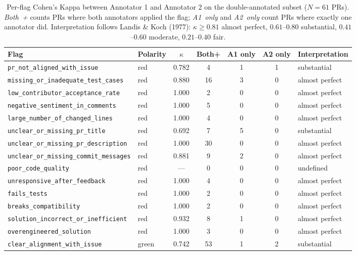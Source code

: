 \begin{table}[!htbp]
\centering
\caption{Per-flag Cohen's Kappa between Annotator 1 and Annotator 2 on the double-annotated subset ($N=61$ PRs). \emph{Both~+} counts PRs where both annotators applied the flag; \emph{A1~only} and \emph{A2~only} count PRs where exactly one annotator did. Interpretation follows Landis \& Koch (1977): $\kappa \geq 0.81$ almost perfect, $0.61$--$0.80$ substantial, $0.41$--$0.60$ moderate, $0.21$--$0.40$ fair.}
\label{tab:perflag-kappa}
\small
\setlength{\tabcolsep}{5pt}
\begin{tabular}{llccccl}
\toprule
Flag & Polarity & $\kappa$ & Both+ & A1 only & A2 only & Interpretation \\
\midrule
\texttt{pr\_not\_aligned\_with\_issue} & red & 0.782 & 4 & 1 & 1 & substantial \\
\texttt{missing\_or\_inadequate\_test\_cases} & red & 0.880 & 16 & 3 & 0 & almost perfect \\
\texttt{low\_contributor\_acceptance\_rate} & red & 1.000 & 2 & 0 & 0 & almost perfect \\
\texttt{negative\_sentiment\_in\_comments} & red & 1.000 & 5 & 0 & 0 & almost perfect \\
\texttt{large\_number\_of\_changed\_lines} & red & 1.000 & 4 & 0 & 0 & almost perfect \\
\texttt{unclear\_or\_missing\_pr\_title} & red & 0.692 & 7 & 5 & 0 & substantial \\
\texttt{unclear\_or\_missing\_pr\_description} & red & 1.000 & 30 & 0 & 0 & almost perfect \\
\texttt{unclear\_or\_missing\_commit\_messages} & red & 0.881 & 9 & 2 & 0 & almost perfect \\
\texttt{poor\_code\_quality} & red & --- & 0 & 0 & 0 & undefined \\
\texttt{unresponsive\_after\_feedback} & red & 1.000 & 4 & 0 & 0 & almost perfect \\
\texttt{fails\_tests} & red & 1.000 & 2 & 0 & 0 & almost perfect \\
\texttt{breaks\_compatibility} & red & 1.000 & 2 & 0 & 0 & almost perfect \\
\texttt{solution\_incorrect\_or\_inefficient} & red & 0.932 & 8 & 1 & 0 & almost perfect \\
\texttt{overengineered\_solution} & red & 1.000 & 3 & 0 & 0 & almost perfect \\
\midrule
\texttt{clear\_alignment\_with\_issue} & green & 0.742 & 53 & 1 & 2 & substantial \\

\end{tabular}
\end{table}
